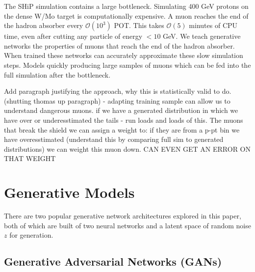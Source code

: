 \documentclass{article}
\begin{document}
    The SHiP simulation contains a large bottleneck. Simulating 400 GeV protons on the dense W/Mo target is computationally expensive. A muon reaches the end of the hadron absorber every $\mathcal{O}(10^{3})$ POT. This takes $\mathcal{O}(5)$ minutes of CPU time, even after cutting any particle of energy $<10$ GeV. We teach generative networks the properties of muons that reach the end of the hadron absorber. When trained these networks can accurately approximate these slow simulation steps. Models quickly producing large samples of muons which can be fed into the full simulation after the bottleneck. 
    
    Add paragraph justifying the approach, why this is statistically valid to do. (shutting thomas up paragraph) - adapting training sample can allow us to understand dangerous muons. if we have a generated distribution in which we have over or underesstimated the tails - run loads and loads of this. The muons that break the shield we can assign a weight to: if they are from a p-pt bin we have overesstimated (understand this by comparing full sim to generated distributions) we can weight this muon down. CAN EVEN GET AN ERROR ON THAT WEIGHT

\section{Generative Models}

    There are two popular generative network architectures explored in this paper, both of which are built of two neural networks and a latent space of random noise $z$ for generation. 

    \subsection{Generative Adversarial Networks (GANs)}\label{GANs}
    
    
\end{document}
